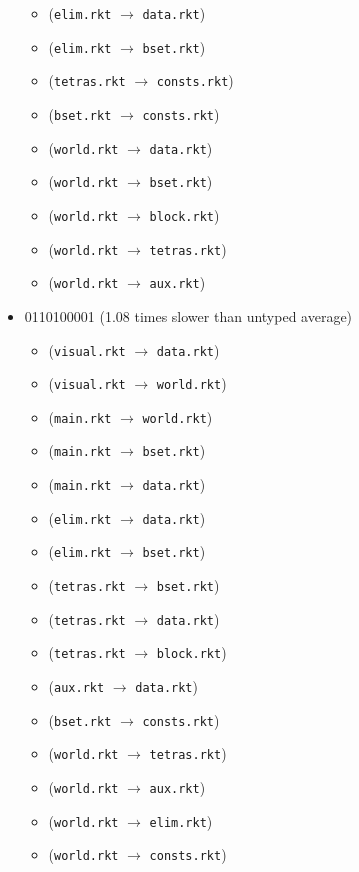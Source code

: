 \documentclass{article}
\newcommand{\mono}[1]{\texttt{#1}}
\begin{document}
\begin{itemize}
\begin{itemize}
  \item (\mono{elim.rkt} $\rightarrow$ \mono{data.rkt})
  \item (\mono{elim.rkt} $\rightarrow$ \mono{bset.rkt})
  \item (\mono{tetras.rkt} $\rightarrow$ \mono{consts.rkt})
  \item (\mono{bset.rkt} $\rightarrow$ \mono{consts.rkt})
  \item (\mono{world.rkt} $\rightarrow$ \mono{data.rkt})
  \item (\mono{world.rkt} $\rightarrow$ \mono{bset.rkt})
  \item (\mono{world.rkt} $\rightarrow$ \mono{block.rkt})
  \item (\mono{world.rkt} $\rightarrow$ \mono{tetras.rkt})
  \item (\mono{world.rkt} $\rightarrow$ \mono{aux.rkt})
  \end{itemize}
\item 0110100001 (1.08 times slower than untyped average)
  \begin{itemize}
  \item (\mono{visual.rkt} $\rightarrow$ \mono{data.rkt})
  \item (\mono{visual.rkt} $\rightarrow$ \mono{world.rkt})
  \item (\mono{main.rkt} $\rightarrow$ \mono{world.rkt})
  \item (\mono{main.rkt} $\rightarrow$ \mono{bset.rkt})
  \item (\mono{main.rkt} $\rightarrow$ \mono{data.rkt})
  \item (\mono{elim.rkt} $\rightarrow$ \mono{data.rkt})
  \item (\mono{elim.rkt} $\rightarrow$ \mono{bset.rkt})
  \item (\mono{tetras.rkt} $\rightarrow$ \mono{bset.rkt})
  \item (\mono{tetras.rkt} $\rightarrow$ \mono{data.rkt})
  \item (\mono{tetras.rkt} $\rightarrow$ \mono{block.rkt})
  \item (\mono{aux.rkt} $\rightarrow$ \mono{data.rkt})
  \item (\mono{bset.rkt} $\rightarrow$ \mono{consts.rkt})
  \item (\mono{world.rkt} $\rightarrow$ \mono{tetras.rkt})
  \item (\mono{world.rkt} $\rightarrow$ \mono{aux.rkt})
  \item (\mono{world.rkt} $\rightarrow$ \mono{elim.rkt})
  \item (\mono{world.rkt} $\rightarrow$ \mono{consts.rkt})

\end{itemize}
\end{itemize}
\end{document}
